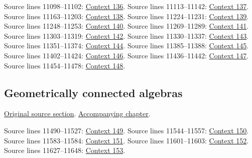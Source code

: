 \begin{AlgebraSourceRoutes}
 Source lines 11098--11102: \hyperlink{algebra-context-136}{Context 136}.
 Source lines 11113--11142: \hyperlink{algebra-context-137}{Context 137}.
 Source lines 11163--11203: \hyperlink{algebra-context-138}{Context 138}.
 Source lines 11224--11231: \hyperlink{algebra-context-139}{Context 139}.
 Source lines 11248--11253: \hyperlink{algebra-context-140}{Context 140}.
 Source lines 11269--11289: \hyperlink{algebra-context-141}{Context 141}.
 Source lines 11303--11319: \hyperlink{algebra-context-142}{Context 142}.
 Source lines 11330--11337: \hyperlink{algebra-context-143}{Context 143}.
 Source lines 11351--11374: \hyperlink{algebra-context-144}{Context 144}.
 Source lines 11385--11388: \hyperlink{algebra-context-145}{Context 145}.
 Source lines 11402--11424: \hyperlink{algebra-context-146}{Context 146}.
 Source lines 11436--11442: \hyperlink{algebra-context-147}{Context 147}.
 Source lines 11454--11478: \hyperlink{algebra-context-148}{Context 148}.
\end{AlgebraSourceRoutes}

\subsection{Geometrically connected algebras}
\hypertarget{algebra-source-section-geometrically-connected}{}
\noindent\href{https://github.com/stacks/stacks-project/blob/a04446e57ec1fbc252a871afcec7752fb2807b14/algebra.tex\#L11484}{Original source section}. \href{algebra.pdf\#nameddest=section-geometrically-connected}{Accompanying chapter}.

\begin{AlgebraSourceRoutes}
 Source lines 11490--11527: \hyperlink{algebra-context-149}{Context 149}.
 Source lines 11544--11557: \hyperlink{algebra-context-150}{Context 150}.
 Source lines 11583--11584: \hyperlink{algebra-context-151}{Context 151}.
 Source lines 11601--11603: \hyperlink{algebra-context-152}{Context 152}.
 Source lines 11627--11648: \hyperlink{algebra-context-153}{Context 153}.
\end{AlgebraSourceRoutes}

